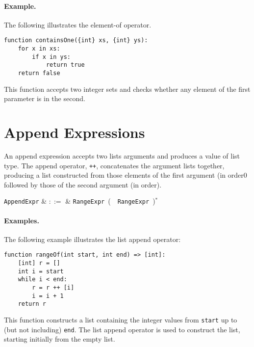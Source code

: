\paragraph{Example.}  The following illustrates the element-of operator.

\begin{lstlisting}
function containsOne({int} xs, {int} ys):
    for x in xs:
        if x in ys:
            return true
    return false
\end{lstlisting}
This function accepts two integer sets and checks whether any element of the first parameter is in the second.


\section{Append Expressions}
\label{c_expr_append}

An append expression accepts two lists arguments and produces a value of list type.  The append operator, \lstinline{++}, concatenates the argument lists together, producing a list constructed from those elements of the first argument (in order0 followed by those of the second argument (in order).

\begin{syntax}
  \verb+AppendExpr+ & $::=$ & \verb+RangeExpr+\ \big(\ \token{++}\
  \verb+RangeExpr+\ \big)$^*$\\
\end{syntax}

\paragraph{Examples.} The following example illustrates the list append operator:
\begin{lstlisting}
function rangeOf(int start, int end) => [int]:
    [int] r = []
    int i = start
    while i < end:
        r = r ++ [i]
        i = i + 1
    return r
\end{lstlisting}

This function constructs a list containing the integer values from \lstinline{start} up to (but not including) \lstinline{end}.  The list append operator is used to construct the list, starting initially from the empty list.


